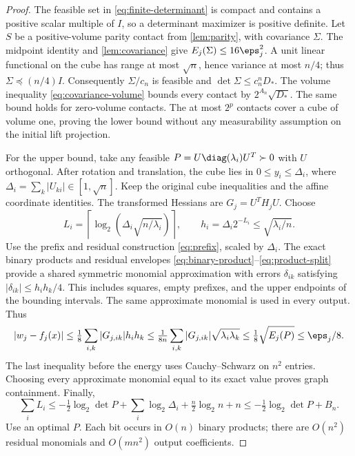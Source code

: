 \begin{proof}
The feasible set in \eqref{eq:finite-determinant} is compact and contains
a positive scalar multiple of $I$, so a determinant maximizer is positive
definite. Let $S$ be a positive-volume parity contact from
\cref{lem:parity}, with covariance $\Sigma$. The midpoint identity and
\cref{lem:covariance} give
$E_j(\Sigma)\le16\eps_j^2$. A unit linear functional on the cube has
range at most $\sqrt n$, hence variance at most $n/4$; thus
$\Sigma\preceq(n/4)I$. Consequently $\Sigma/c_n$ is feasible and
$\det\Sigma\le c_n^nD_*$. The volume inequality
\eqref{eq:covariance-volume} bounds every contact by
$2^{A_n}\sqrt{D_*}$. The same bound holds for zero-volume contacts.
The at most $2^p$ contacts cover a cube of volume one, proving the lower
bound without any measurability assumption on the initial lift projection.

For the upper bound, take any feasible
$P=U\diag(\lambda_i)U^T\succ0$ with $U$ orthogonal. After rotation and
translation, the cube lies in $0\le y_i\le \Delta_i$, where
$\Delta_i=\sum_k|U_{ki}|\in[1,\sqrt n]$. Keep the original cube inequalities
and the affine coordinate identities. The transformed Hessians are
$G_j=U^TH_jU$. Choose
\begin{equation}\label{eq:covariance-grid}
 L_i=\left\lceil\log_2\!\left(\Delta_i\sqrt{n/\lambda_i}\right)\right\rceil,
 \qquad h_i=\Delta_i2^{-L_i}\le\sqrt{\lambda_i/n}.
\end{equation}
Use the prefix and residual construction \eqref{eq:prefix}, scaled by
$\Delta_i$. The exact binary products and residual envelopes
\eqref{eq:binary-product}--\eqref{eq:product-split} provide a shared
symmetric monomial approximation with errors $\delta_{ik}$ satisfying
$|\delta_{ik}|\le h_ih_k/4$. This includes squares, empty prefixes,
and the upper endpoints of the bounding intervals. The same approximate
monomial is used in every output. Thus
\[
 |w_j-f_j(x)|\le\tfrac18\sum_{i,k}|G_{j,ik}|h_ih_k
 \le\tfrac1{8n}\sum_{i,k}|G_{j,ik}|\sqrt{\lambda_i\lambda_k}
 \le\tfrac18\sqrt{E_j(P)}\le\eps_j/8.
\]
The last inequality before the energy uses Cauchy--Schwarz on $n^2$
entries. Choosing every approximate monomial equal to its exact value
proves graph containment. Finally,
\[
 \sum_i L_i\le-\tfrac12\log_2\det P
          +\sum_i\log_2\Delta_i+\tfrac n2\log_2n+n
 \le-\tfrac12\log_2\det P+B_n.
\]
Use an optimal $P$. Each bit occurs in $O(n)$ binary products; there
are $O(n^2)$ residual monomials and $O(mn^2)$ output coefficients.
\end{proof}

